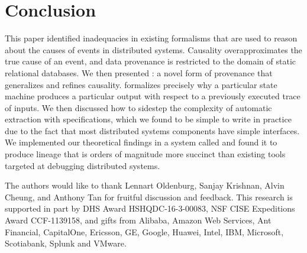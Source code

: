 
\section{Conclusion}
This paper identified inadequacies in existing formalisms that are used to
reason about the causes of events in distributed systems. Causality
overapproximates the true cause of an event, and data provenance is restricted
to the domain of static relational databases.  We then presented
\watprovenance{}: a novel form of provenance that generalizes \whyprovenance{}
and refines causality. \Watprovenance{} formalizes precisely why a particular
state machine produces a particular output with respect to a previously
executed trace of inputs. We then discussed how to sidestep the complexity of
automatic \watprovenance{} extraction with \watprovenance{} specifications,
which we found to be simple to write in practice due to the fact that most
distributed systems components have simple interfaces. We implemented our
theoretical findings in a system called \fluent{} and found it to produce
lineage that is orders of magnitude more succinct than existing tools targeted
at debugging distributed systems.

\begin{acks}
  The authors would like to thank Lennart Oldenburg, Sanjay Krishnan, Alvin
  Cheung, and Anthony Tan for fruitful discussion and feedback.
  This research is supported in part by DHS Award HSHQDC-16-3-00083, NSF CISE
  Expeditions Award CCF-1139158, and gifts from Alibaba, Amazon Web Services, Ant
  Financial, CapitalOne, Ericsson, GE, Google, Huawei, Intel, IBM, Microsoft,
  Scotiabank, Splunk and VMware.
\end{acks}
